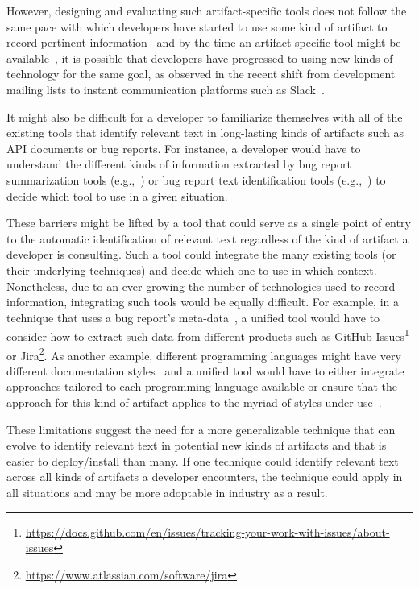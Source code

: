 However, designing and evaluating such artifact-specific tools
does not follow the same pace with which developers have started to use  
some kind of artifact to record pertinent information~\cite{garousi2019}
and by the time an artifact-specific tool might be available~\cite{gibbs1994},
it is possible 
that developers have progressed to using new kinds of technology
for the same goal, as observed in the recent shift from 
development mailing lists to instant communication platforms such as Slack~\cite{Lin2016, Chatterjee2020}. 


It might also be difficult for a developer to familiarize themselves 
with all of the existing tools that identify relevant text in 
long-lasting kinds of artifacts such as API documents or bug reports.
For instance, a developer would have to understand the different kinds of information 
extracted by 
bug report summarization tools (e.g.,~\cite{Rastkar2010, Lotufo2012,li2018deep})
or bug report text identification tools (e.g.,~\cite{huang2018automating, Arya2019, Chaparro2017})
 to decide which tool to use in a given situation. 



These barriers might be lifted by a tool that could serve as a single point of entry to the automatic identification of relevant text regardless of the kind of artifact a developer is consulting.
Such a tool could integrate the many existing tools (or their underlying techniques) and decide which one 
to use in which context. Nonetheless, 
due to an ever-growing the number of technologies used to record information,
integrating such tools would be equally difficult.
For example, in a technique that uses a bug report's meta-data~\cite{Lotufo2012,li2018deep}, a 
unified tool would have to 
consider how to extract such data from different products 
such as 
GitHub Issues\footnote{\url{https://docs.github.com/en/issues/tracking-your-work-with-issues/about-issues}} 
or Jira\footnote{\url{https://www.atlassian.com/software/jira}}.
As another example, different programming languages
might have very different documentation styles~\cite{endrikat2014} 
and a 
unified tool would have to either integrate approaches tailored to each programming language available 
or ensure that the approach for this kind of artifact
applies to the myriad of styles under use~\cite{robillard2011field}.



These limitations suggest the need for a more generalizable technique
that can evolve to 
identify relevant text in potential new kinds of artifacts 
and that is easier to deploy/install than many.
If one technique could identify relevant text across all kinds
of artifacts a developer encounters, the technique
could apply in all situations and may be more adoptable in industry
as a result. 





